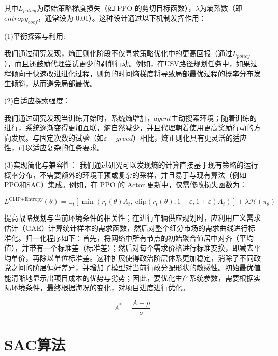 其中$L_{policy}$为原始策略梯度损失（如 PPO 的剪切目标函数），$λ$为熵系数（即$entropy_{coef}$，通常设为 0.01）。这种设计通过以下机制发挥作用：

(1)平衡探索与利用:

我们通过研究发现，熵正则化阶段不仅寻求策略优化中的更高回报（通过$L_{policy}$），而且还鼓励代理尝试更少的剥削行动。例如，在USV路径规划任务中，如果过程倾向于快速改进进化过程，则负的时间熵梯度将导致局部最优过程的概率分布发生倾斜，从而避免局部最优。

(2)自适应探索强度：

我们通过研究发现当训练开始时，系统熵增加，$agent$主动搜索环境；随着训练的进行，系统逐渐变得更加互联，熵自然减少，并且代理朝着使用更高奖励行动的方向发展。与固定次数的试验（如$ε-greed$）相比，熵正则化具有更灵活的适应性，可以适应复杂的任务要求。

(3)实现简化与兼容性：
我们通过研究可以发现熵的计算直接基于现有策略的运行概率分布，不需要额外的环境干预或复杂的采样，并且易于与现有算法（例如PPO和SAC）集成。例如，在 PPO 的 Actor 更新中，仅需修改损失函数为：

\begin{equation}
	L^{\text{CLIP+Entropy}}(\theta) = \mathbb{E}_t \left[ \min\left( r_t(\theta) A_t, \ \text{clip}\left( r_t(\theta), 1-\varepsilon, 1+\varepsilon \right) A_t \right) \right] + \lambda \mathcal{H}(\pi_\theta)
\end{equation}


提高战略规划与当前环境条件的相关性；在进行车辆供应规划时，应利用广义需求估计（GAE）计算统计样本的需求函数，然后对整个细分市场的需求曲线进行标准化。归一化程序如下：首先，将网络中所有节点的初始聚合值居中对齐（平均值），并带有一个标准差（标准差）；然后对每个需求价格进行标准变换，即减去平均单价，再除以单位标准差。这种扩展使得政治阶层体系更加稳定，消除了不同政党之间的阶层偏好差异，并增加了模型对当前行政分配形状的敏感性。初始最优值能清晰地显示出项目成本的优势与劣势；因此，要优化生产系统参数，需要根据实际环境条件，最终根据海况的变化，对项目进度进行优化。

\begin{equation}
	A^* = \frac{A - \mu}{\sigma}
\end{equation}

\section{SAC算法}

